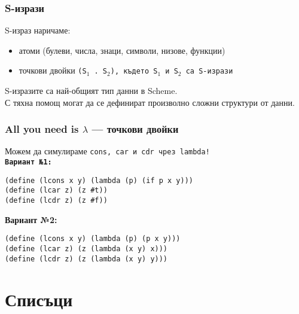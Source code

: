 \documentclass{beamer}
\begin{document}
\begin{frame}
  \frametitle{S-изрази}

  \begin{definition}
    S-израз наричаме:
    \begin{itemize}
    \item атоми (булеви, числа, знаци, символи, низове, функции)
    \item точкови двойки \tt{(S$_1$ . S$_2$)}, където \tt{S$_1$} и \tt{S$_2$} са S-изрази
    \end{itemize}
  \end{definition}
  \vspace{1em}
  \pause
  \alert{S-изразите са най-общият тип данни в Scheme.}\\[1em]
  С тяхна помощ могат да се дефинират произволно сложни структури от данни.
\end{frame}

\begin{frame}[fragile]
  \frametitle{All you need is $\lambda$ --- точкови двойки}

  Можем да симулираме \tt{cons}, \tt{car} и \tt{cdr} чрез \tt{lambda}!\\[1em]
  \pause
  \textbf{Вариант №1:}
\begin{lstlisting}
(define (lcons x y) (lambda (p) (if p x y)))
(define (lcar z) (z #t))
(define (lcdr z) (z #f))
\end{lstlisting}
  \pause
  \textbf{Вариант №2:}
\begin{lstlisting}
(define (lcons x y) (lambda (p) (p x y)))
(define (lcar z) (z (lambda (x y) x)))
(define (lcdr z) (z (lambda (x y) y)))
\end{lstlisting}
\end{frame}

\section{Списъци}
\end{document}
